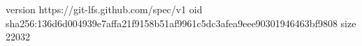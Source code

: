 version https://git-lfs.github.com/spec/v1
oid sha256:136d6d004939e7affa21f9158b51af9961c5dc3afea9eee90301946463bf9808
size 22032

